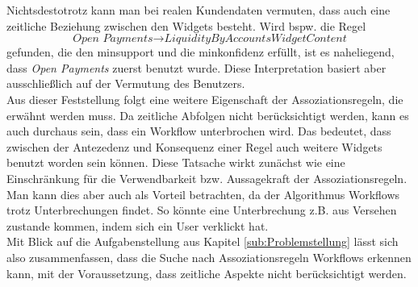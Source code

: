 Nichtsdestotrotz kann man bei realen Kundendaten vermuten, dass auch eine zeitliche Beziehung zwischen den Widgets besteht. Wird bspw. die Regel 
\begin{equation*}
\textit{Open Payments} \rightarrow \textit{LiquidityByAccountsWidgetContent} 
\end{equation*}
gefunden, die den minsupport und die minkonfidenz erfüllt, ist es naheliegend, dass \textit{Open Payments} zuerst benutzt wurde. Diese Interpretation basiert aber ausschließlich auf der Vermutung des Benutzers.\\
Aus dieser Feststellung folgt eine weitere Eigenschaft der Assoziationsregeln, die erwähnt werden muss. Da zeitliche Abfolgen nicht berücksichtigt werden, kann es auch durchaus sein, dass ein Workflow \glqq unterbrochen\grqq{} wird. Das bedeutet, dass zwischen der Antezedenz und Konsequenz einer Regel auch weitere Widgets benutzt worden sein können. Diese Tatsache wirkt zunächst wie eine Einschränkung für die Verwendbarkeit bzw. Aussagekraft der Assoziationsregeln. Man kann dies aber auch als Vorteil betrachten, da der Algorithmus Workflows trotz Unterbrechungen findet. So könnte eine Unterbrechung z.B. aus Versehen zustande kommen, indem sich ein User \glqq verklickt\grqq{} hat.\\
Mit Blick auf die Aufgabenstellung aus Kapitel \ref{sub:Problemstellung} lässt sich also zusammenfassen, dass die Suche nach Assoziationsregeln Workflows erkennen kann, mit der Voraussetzung, dass zeitliche Aspekte nicht berücksichtigt werden.
\clearpage
